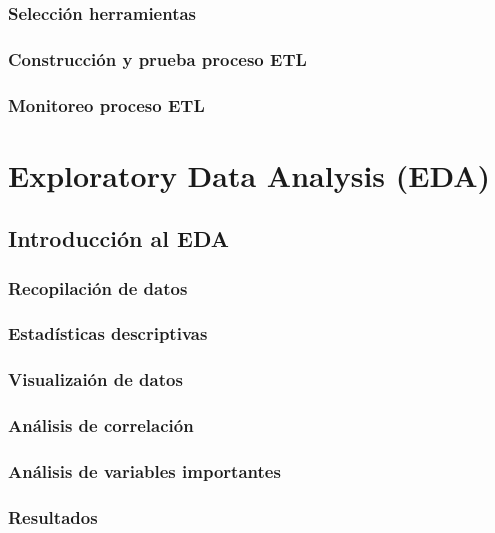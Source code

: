 \documentclass{report}
\begin{document}
\subsection{Selección herramientas}


\subsection{Construcción y prueba proceso ETL}


\subsection{Monitoreo proceso ETL}


\chapter{Exploratory Data Analysis (EDA)}

\section{Introducción al EDA}


\subsection{Recopilación de datos}


\subsection{Estadísticas descriptivas}


\subsection{Visualizaión de datos}


\subsection{Análisis de correlación}


\subsection{Análisis de variables importantes}


\subsection{Resultados}




\end{document}
